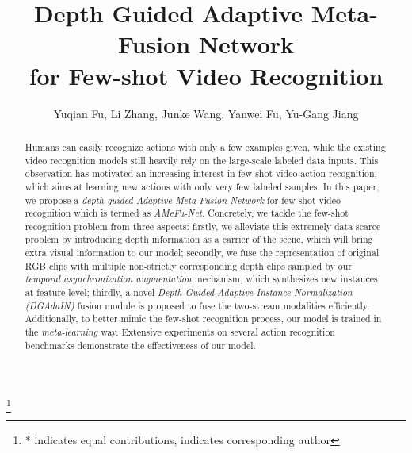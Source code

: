 \documentclass[sigconf]{acmart}
\begin{document}
	
\fancyhead{} 
	
\title{Depth Guided Adaptive Meta-Fusion Network \\ for Few-shot Video Recognition}
	
\author[Y. Fu, L. Zhang, J. Wang, Y. Fu, Y.-G. Jiang]{Yuqian Fu, Li Zhang, Junke Wang, Yanwei Fu, Yu-Gang Jiang}
	\thanks{* indicates equal contributions,  indicates corresponding author}
	
\renewcommand{\shortauthors}{Fu and Zhang, et al.}
	
	
\begin{abstract}
		Humans can easily recognize actions with only a few examples given, while the existing video recognition models still heavily rely on the large-scale labeled data inputs. This observation has motivated an increasing interest in few-shot video action recognition, which aims at learning new actions with only very few labeled samples. In this paper, we propose a \emph{depth guided Adaptive Meta-Fusion Network}  for few-shot video recognition which is termed as \emph{AMeFu-Net}. Concretely, we tackle the few-shot recognition problem from three aspects: firstly, we alleviate this extremely data-scarce problem by introducing depth information as a carrier of the scene, which will bring extra visual information to our model; secondly, we fuse the representation of original RGB clips with multiple non-strictly corresponding depth clips sampled by our \emph{temporal asynchronization augmentation} mechanism, which synthesizes new instances at feature-level; {thirdly,} a novel \emph{Depth Guided Adaptive Instance Normalization (DGAdaIN)} fusion module is proposed to fuse the two-stream modalities efficiently. Additionally, to better mimic the few-shot recognition process, our model is trained in the \emph{meta-learning} way. Extensive experiments on several action recognition benchmarks demonstrate the effectiveness of our model.
	\end{abstract}
	
	
	
\end{document}
